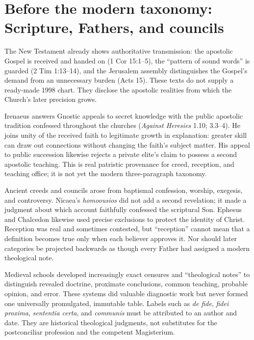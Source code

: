 \section{Before the modern taxonomy: Scripture, Fathers, and councils}

The New Testament already shows authoritative transmission: the apostolic
Gospel is received and handed on (1 Cor 15:1--5), the ``pattern of sound words''
is guarded (2 Tim 1:13--14), and the Jerusalem assembly distinguishes the
Gospel's demand from an unnecessary burden (Acts 15). These texts do not supply
a ready-made 1998 chart. They disclose the apostolic realities from which the
Church's later precision grows.

Irenaeus answers Gnostic appeals to secret knowledge with the public apostolic
tradition confessed throughout the churches (\emph{Against Heresies}
1.10; 3.3--4). He joins unity of the received faith to legitimate growth in
explanation: greater skill can draw out connections without changing the
faith's subject matter. His appeal to public succession likewise rejects a
private elite's claim to possess a second apostolic teaching. This is real
patristic provenance for creed, reception, and teaching office; it is not yet
the modern three-paragraph taxonomy.

Ancient creeds and councils arose from baptismal confession, worship, exegesis,
and controversy. Nicaea's \emph{homoousios} did not add a second revelation; it
made a judgment about which account faithfully confessed the scriptural Son.
Ephesus and Chalcedon likewise used precise exclusions to protect the identity
of Christ. Reception was real and sometimes contested, but ``reception''
cannot mean that a definition becomes true only when each believer approves
it. Nor should later categories be projected backwards as though every Father
had assigned a modern theological note.

Medieval schools developed increasingly exact censures and ``theological
notes'' to distinguish revealed doctrine, proximate conclusions, common
teaching, probable opinion, and error. These systems did valuable diagnostic
work but never formed one universally promulgated, immutable table. Labels
such as \emph{de fide}, \emph{fidei proxima}, \emph{sententia certa}, and
\emph{communis} must be attributed to an author and date. They are historical
theological judgments, not substitutes for the postconciliar profession and
the competent Magisterium.

